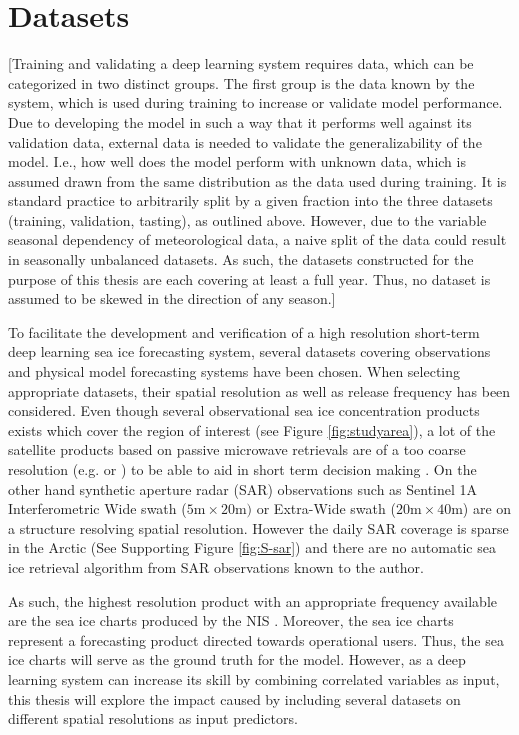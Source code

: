 \documentclass[../main/thesis.tex]{subfiles}
\begin{document}
\section{Datasets}
[Training and validating a deep learning system requires data, which can be categorized in two distinct groups. The first group is the data known by the system, which is used during training to increase or validate model performance. Due to developing the model in such a way that it performs well against its validation data, external data is needed to validate the generalizability of the model. I.e., how well does the model perform with unknown data, which is assumed drawn from the same distribution as the data used during training. It is standard practice to arbitrarily split by a given fraction into the three datasets (training, validation, tasting), as outlined above. However, due to the variable seasonal dependency of meteorological data, a naive split of the data could result in seasonally unbalanced datasets. As such, the datasets constructed for the purpose of this thesis are each covering at least a full year. Thus, no dataset is assumed to be skewed in the direction of any season.] 

To facilitate the development and verification of a high resolution short-term deep learning sea ice forecasting system, several datasets covering observations and physical model forecasting systems have been chosen. When selecting appropriate datasets, their spatial resolution as well as release frequency has been considered. Even though several observational sea ice concentration products exists which cover the region of interest (see Figure \ref{fig:studyarea}), a lot of the satellite products based on passive microwave retrievals are of a too coarse resolution (e.g. \citet{Lavergne2019} or \citet{Kern2019}) to be able to aid in short term decision making \citep{Wagner2020}. On the other hand synthetic aperture radar (SAR) observations such as Sentinel 1A Interferometric Wide swath ($5\text{m} \times 20\text{m})$ or Extra-Wide swath ($20\text{m} \times 40\text{m}$) are on a structure resolving spatial resolution. However the daily SAR coverage is sparse in the Arctic (See Supporting Figure \ref{fig:S-sar}) and there are no automatic sea ice retrieval algorithm from SAR observations known to the author.

As such, the highest resolution product with an appropriate frequency available are the sea ice charts produced by the NIS \cite{Dinessen2020}. Moreover, the sea ice charts represent a forecasting product directed towards operational users. Thus, the sea ice charts will serve as the ground truth for the model. However, as a deep learning system can increase its skill by combining correlated variables as input, this thesis will explore the impact caused by including several datasets on different spatial resolutions as input predictors.
\end{document}
